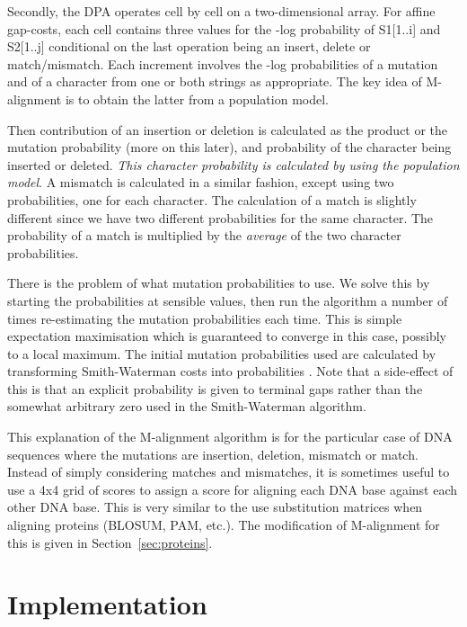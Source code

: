 \documentclass[letterpaper,11pt,oneside]{article}
\begin{document}
\begin{multicols}{2}
Secondly,
the DPA operates cell by cell on a two-dimensional array.
For affine gap-costs, each cell contains three values for the -log probability
of S1[1..i] and S2[1..j] conditional on the last operation
being an insert, delete or match/mismatch.
Each increment involves the -log probabilities of a mutation and
of a character from one or both strings as appropriate.
The key idea of M-alignment is to obtain the latter from a population model.

Then contribution of an insertion or deletion is calculated as the product or
the mutation probability (more on this later), and probability of the
character being inserted or deleted.  {\em This character probability is
calculated by using the population model}.  A mismatch is calculated in a
similar fashion, except using two probabilities, one for each character.  The
calculation of a match is slightly different since we have two different
probabilities for the same character.  The probability of a match is
multiplied by the {\em average} of the two character probabilities.

There is the problem of what mutation probabilities to use.  We solve this by
starting the probabilities at sensible values, then run the algorithm a number
of times re-estimating the mutation probabilities each time.  This is simple
expectation maximisation which is guaranteed to converge in this case,
possibly to a local maximum.  The initial mutation probabilities used are
calculated by transforming Smith-Waterman costs into probabilities
\cite{allison93a}.  Note that a side-effect of this is that an explicit
probability is given to terminal gaps rather than the somewhat arbitrary zero
used in the Smith-Waterman algorithm.

This explanation of the M-alignment algorithm is for the particular case of
DNA sequences where the mutations are insertion, deletion, mismatch or match.
Instead of simply considering matches and mismatches, it is sometimes useful
to use a 4x4 grid of scores to assign a score for aligning each DNA base
against each other DNA base.  This is very similar to the use substitution
matrices when aligning proteins (BLOSUM, PAM, etc.).  The modification of
M-alignment for this is given in Section~\ref{sec:proteins}.

\section{Implementation} \label{sec:impl}


\end{multicols}
\end{document}
